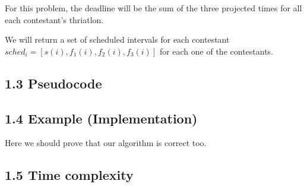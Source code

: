 \documentclass{article}
\begin{document}
For this problem, the deadline will be the sum of the three projected times for all each contestant's thriatlon.

We will return a set of scheduled intervals for each contestant $sched_i = [s(i),f_1(i),f_2(i),f_3(i)]$ for each one of the contestants.

\subsection*{1.3 Pseudocode}


\subsection*{1.4 Example (Implementation)}

Here we should prove that our algorithm is correct too.

\subsection*{1.5 Time complexity}
\end{document}
